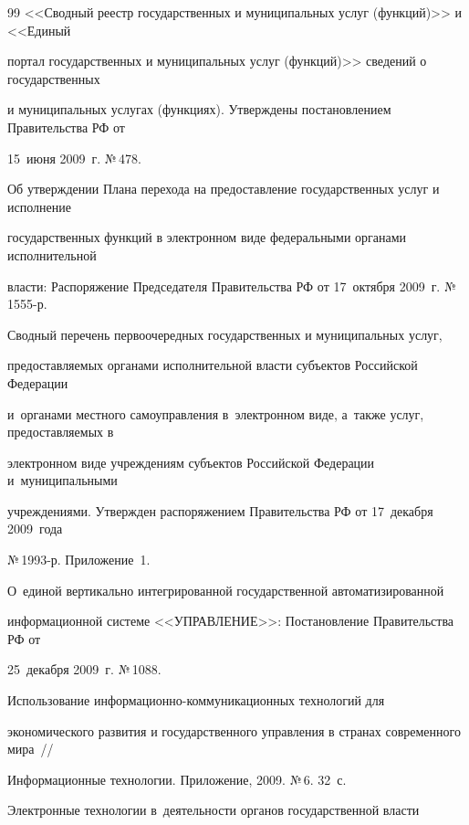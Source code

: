 {{\begin{thebibliography}{99}
<<Сводный реестр государственных и муниципальных услуг (функций)>> и <<Единый

портал государственных и муниципальных услуг (функций)>> сведений о государственных

и муниципальных услугах (функциях). Утверждены постановлением Правительства РФ от

15~июня 2009~г. №\,478.




 Об утверждении Плана перехода на предоставление государственных услуг и исполнение

государственных функций в электронном виде федеральными органами исполнительной

власти: Распоряжение Председателя Правительства РФ от 17~октября 2009~г. №\,1555-р.




Сводный перечень первоочередных государственных и муниципальных услуг,

предо\-став\-ля\-емых органами исполнительной власти субъектов Российской Федерации

и~органами местного самоуправления в~электронном виде, а~также услуг, предоставляемых в

электронном виде учреждениям субъектов Российской Федерации и~муниципальными

учреждениями. Утвержден распоряжением Правительства РФ от 17~декабря 2009~года

№\,1993-р. Приложение~1.




О~единой вертикально интегрированной государственной автоматизированной

информационной системе <<УПРАВЛЕНИЕ>>: Постановление Правительства РФ от

25~декабря 2009~г. №\,1088.




 Использование информационно-коммуникационных технологий для

экономического развития и государственного управления в странах современного мира~/\!\!/

Информационные технологии. Приложение, 2009. №\,6. 32~с.


 Электронные технологии в~деятельности органов государственной власти


\end{thebibliography}}}
